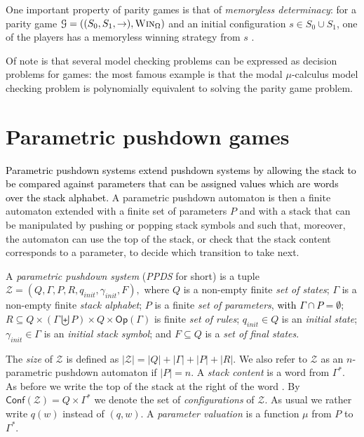 \documentclass[a4paper,UKenglish,cleveref, autoref, thm-restate]{lipics-v2021}
\newcommand\mh[1]{\todo[inline,size=\scriptsize]{#1 - \textbf{Mathieu}}}
\newcommand{\Conf}{\mathsf{Conf}}
\newcommand{\Op}{\mathsf{Op}}
\newcommand{\win}{\textsc{Win}}
\begin{document}
One important property of parity games is that of {\em memoryless determinacy}: for a parity game
$\mathcal{G}= ((S_0,S_1,\rightarrow),\win_\Omega) $ and an initial configuration $s \in S_0 \cup S_1$, one of the players has a memoryless winning strategy from $s$ \cite{zielonka1998infinite}.

Of note is that several model checking problems %
can be expressed as decision problems for games: the most famous example is that the modal $\mu$-calculus model checking problem is polynomially equivalent to solving the parity game problem. 


\section{Parametric pushdown games}





\textcolor{black}{Parametric pushdown systems extend pushdown systems by allowing the stack to be compared against parameters that can be assigned values which are words over the stack alphabet.}
A parametric pushdown automaton is then a finite automaton extended with a finite set of parameters $P$  and with a stack that can be manipulated by pushing or popping stack symbols and such that, moreover, the automaton can use the top of the stack, or check that the stack content corresponds to a parameter,  to decide which transition to take next.\\

\par\noindent\ignorespacesafterend
A {\em parametric pushdown system} ({\em PPDS} for short) 
is a tuple $\mathcal{Z} = (Q, \Gamma, P, R, q_{init},\gamma_{init}, F),$ where
 $Q$ is a non-empty finite {\em set of  states};
 $\Gamma$ is a non-empty finite {\em  stack alphabet};
 $P$ is a finite {\em   set of parameters}, \textcolor{black}{with $\Gamma \cap P = \emptyset$};
  $R   \subseteq  Q  \times (\Gamma \biguplus P)  \times Q  \times \Op(\Gamma)$ is finite {\em  set of rules};
 $q_{init}\in Q$ is an {\em initial  state};
 $ \gamma_{init} \in \Gamma$ is an {\em initial stack symbol}; and
 $F\subseteq Q$ is a {\em set of final  states}.


The {\em size} of $\mathcal{Z}$ is defined as
$|\mathcal{Z}| = |Q| + |\Gamma| + |P| + |R| $.
We also refer to $\mathcal{Z}$ as an $n$-parametric pushdown automaton if $|P| = n$.
A {\em stack content} is a word from $ \Gamma^*$. 
As before we write the top
of the stack at the right of the word%
. 
By $\Conf(\mathcal{Z})=Q\times  \Gamma^*$ we denote the set of
{\em configurations} of $\mathcal{Z}$. As usual we rather write $q(w)$ instead of $(q, w)$.
A {\em parameter valuation} is a function $\mu$ from $P$ to $\Gamma^*$.
\end{document}
